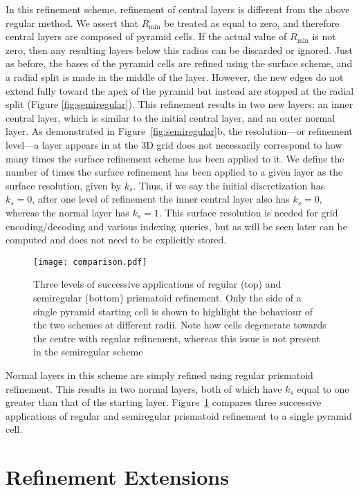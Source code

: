 In this refinement scheme, refinement of central layers is different from the above regular method.
We assert that $R_\mathrm{min}$ be treated as equal to zero, and therefore central layers are composed of pyramid cells.
If the actual value of $R_\mathrm{min}$ is not zero, then any resulting layers below this radius can be discarded or ignored.
Just as before, the bases of the pyramid cells are refined using the surface scheme, and a radial split is made in the middle of the layer.
However, the new edges do not extend fully toward the apex of the pyramid but instead are stopped at the radial split (Figure \ref{fig:semiregular}).
This refinement results in two new layers: an inner central layer, which is similar to the initial central layer, and an outer normal layer.
As demonstrated in Figure~\ref{fig:semiregular}b, the resolution---or refinement level---a layer appears in at the 3D grid does not necessarily correspond to how many times the surface refinement scheme has been applied to it.
We define the number of times the surface refinement has been applied to a given layer as the surface resolution, given by $k_s$.
Thus, if we say the initial discretization has $k_s = 0$, after one level of refinement the inner central layer also has $k_s = 0$, whereas the normal layer has $k_s = 1$.
This surface resolution is needed for grid encoding/decoding and various indexing queries, but as will be seen later can be computed and does not need to be explicitly stored.


\begin{figure}[h]
	\centering
	\texttt{[image: comparison.pdf]}
	\caption{Three levels of successive applications of regular (top) and semiregular (bottom) prismatoid refinement.
		Only the side of a single pyramid starting cell is shown to highlight the behaviour of the two schemes at different radii.
		Note how cells degenerate towards the centre with regular refinement, whereas this issue is not present in the semiregular scheme}
	\label{fig:multipleSL}
\end{figure}


Normal layers in this scheme are simply refined using regular prismatoid refinement.
This results in two normal layers, both of which have $k_s$ equal to one greater than that of the starting layer.
Figure~\ref{fig:multipleSL} compares three successive applications of regular and semiregular prismatoid refinement to a single pyramid cell.

\section{Refinement Extensions}

